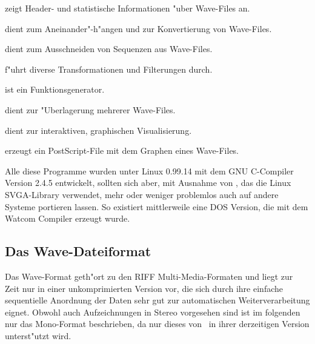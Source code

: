 \begin{description}\parskip=0pt
\item[winf] zeigt Header- und statistische Informationen "uber Wave-Files an.
\item[wcat] dient zum Aneinander"-h"angen und zur Konvertierung von
Wave-Files.
\item[wcut] dient zum Ausschneiden von Sequenzen aus Wave-Files.
\item[wflt] f"uhrt diverse Transformationen und Filterungen durch.
\item[wfct] ist ein Funktionsgenerator.
\item[wmix] dient zur "Uberlagerung mehrerer Wave-Files.
\item[wview] dient zur interaktiven, graphischen Visualisierung.
\item[wplot] erzeugt ein PostScript-File mit dem Graphen eines Wave-Files.
\end{description}

Alle diese Programme wurden unter Linux 0.99.14 mit dem GNU C-Compiler
Version 2.4.5 entwickelt, sollten sich aber, mit Ausnahme von \wview,
das die Linux SVGA-Library verwendet, mehr oder weniger problemlos
auch auf andere Systeme portieren lassen. So existiert mittlerweile
eine DOS Version, die mit dem Watcom Compiler erzeugt wurde.


\subsection{Das Wave-Dateiformat}

Das Wave-Format geth"ort zu den RIFF Multi-Media-Formaten und liegt
zur Zeit nur in einer unkomprimierten Version vor, die sich durch
ihre einfache sequentielle Anordnung der Daten sehr gut zur 
automatischen Weiterverarbeitung eignet.
Obwohl auch Aufzeichnungen in Stereo vorgesehen sind ist im 
folgenden nur das Mono-Format beschrieben, da nur dieses von 
\wavetools\ in ihrer derzeitigen Version unterst"utzt wird.

